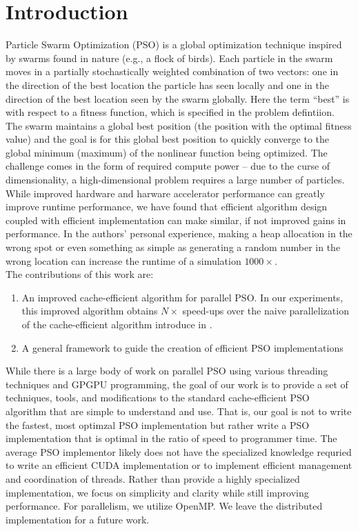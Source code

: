\section{Introduction}
Particle Swarm Optimization (PSO) \cite{pso} is a global optimization technique
inspired by swarms found in nature (e.g., a flock of birds).
Each particle in the swarm moves in a partially stochastically weighted
combination of two vectors: one in the direction of the best location the
particle has seen locally and one in the direction of the best location seen by
the swarm globally. Here the term ``best'' is with respect to a fitness
function, which is specified in the problem defintiion.
The swarm maintains a global best position (the position
with the optimal fitness value) and the goal is for this global best position to
quickly converge to the global minimum (maximum) of the nonlinear function being
optimized.  The challenge comes in the form of required compute power -- due to
the curse of dimensionality, a high-dimensional problem requires a large number
of particles. While improved hardware and harware accelerator performance can
greatly improve runtime performance, we have found that efficient algorithm
design coupled with efficient implementation can make similar, if not improved
gains in performance. In the authors'
personal experience, making a heap allocation in the wrong spot or even
something as simple as generating a random number in the wrong location can
increase the runtime of a simulation $1000\times$.\\
The contributions of this work are:

\begin{enumerate}
\item An improved cache-efficient algorithm for parallel PSO. In our
  experiments, this improved algorithm obtains $N\times$ speed-ups over the
  naive parallelization of the cache-efficient algorithm introduce in
  \cite{cache-pso}.
\item A general framework to guide the creation of efficient PSO implementations
\end{enumerate}

While there is a large body of work on parallel PSO using various threading
techniques and GPGPU programming, the goal of our work is to provide a set
of techniques, tools, and modifications to the standard cache-efficient PSO
algorithm that are simple to understand and use. That is, our goal is not to
write the fastest, most optimzal PSO implementation but rather write a PSO
implementation that is optimal in the ratio of speed to programmer time.
The average PSO implementor
likely does not have the specialized knowledge requried to write an efficient
CUDA implementation or to implement efficient management and coordination of
threads. Rather than provide a highly specialized implementation, we focus on
simplicity and clarity while still improving performance. For parallelism, we
utilize OpenMP. We leave the distributed implementation for a future work.

